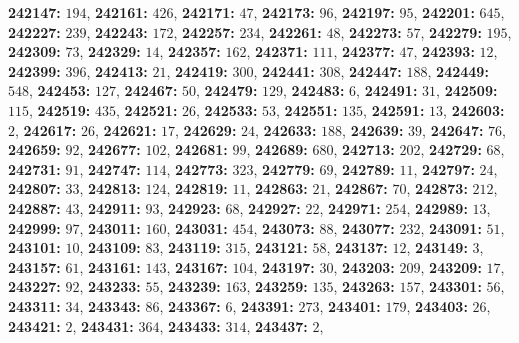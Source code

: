 \textsf{\bfseries 242147:} $194$, \textsf{\bfseries 242161:} $426$, \textsf{\bfseries 242171:} $47$, \textsf{\bfseries 242173:} $96$, \textsf{\bfseries 242197:} $95$, \textsf{\bfseries 242201:} $645$, \textsf{\bfseries 242227:} $239$, \textsf{\bfseries 242243:} $172$, \textsf{\bfseries 242257:} $234$, \textsf{\bfseries 242261:} $48$, \textsf{\bfseries 242273:} $57$, \textsf{\bfseries 242279:} $195$, \textsf{\bfseries 242309:} $73$, \textsf{\bfseries 242329:} $14$, \textsf{\bfseries 242357:} $162$, \textsf{\bfseries 242371:} $111$, \textsf{\bfseries 242377:} $47$, \textsf{\bfseries 242393:} $12$, \textsf{\bfseries 242399:} $396$, \textsf{\bfseries 242413:} $21$, \textsf{\bfseries 242419:} $300$, \textsf{\bfseries 242441:} $308$, \textsf{\bfseries 242447:} $188$, \textsf{\bfseries 242449:} $548$, \textsf{\bfseries 242453:} $127$, \textsf{\bfseries 242467:} $50$, \textsf{\bfseries 242479:} $129$, \textsf{\bfseries 242483:} $6$, \textsf{\bfseries 242491:} $31$, \textsf{\bfseries 242509:} $115$, \textsf{\bfseries 242519:} $435$, \textsf{\bfseries 242521:} $26$, \textsf{\bfseries 242533:} $53$, \textsf{\bfseries 242551:} $135$, \textsf{\bfseries 242591:} $13$, \textsf{\bfseries 242603:} $2$, \textsf{\bfseries 242617:} $26$, \textsf{\bfseries 242621:} $17$, \textsf{\bfseries 242629:} $24$, \textsf{\bfseries 242633:} $188$, \textsf{\bfseries 242639:} $39$, \textsf{\bfseries 242647:} $76$, \textsf{\bfseries 242659:} $92$, \textsf{\bfseries 242677:} $102$, \textsf{\bfseries 242681:} $99$, \textsf{\bfseries 242689:} $680$, \textsf{\bfseries 242713:} $202$, \textsf{\bfseries 242729:} $68$, \textsf{\bfseries 242731:} $91$, \textsf{\bfseries 242747:} $114$, \textsf{\bfseries 242773:} $323$, \textsf{\bfseries 242779:} $69$, \textsf{\bfseries 242789:} $11$, \textsf{\bfseries 242797:} $24$, \textsf{\bfseries 242807:} $33$, \textsf{\bfseries 242813:} $124$, \textsf{\bfseries 242819:} $11$, \textsf{\bfseries 242863:} $21$, \textsf{\bfseries 242867:} $70$, \textsf{\bfseries 242873:} $212$, \textsf{\bfseries 242887:} $43$, \textsf{\bfseries 242911:} $93$, \textsf{\bfseries 242923:} $68$, \textsf{\bfseries 242927:} $22$, \textsf{\bfseries 242971:} $254$, \textsf{\bfseries 242989:} $13$, \textsf{\bfseries 242999:} $97$, \textsf{\bfseries 243011:} $160$, \textsf{\bfseries 243031:} $454$, \textsf{\bfseries 243073:} $88$, \textsf{\bfseries 243077:} $232$, \textsf{\bfseries 243091:} $51$, \textsf{\bfseries 243101:} $10$, \textsf{\bfseries 243109:} $83$, \textsf{\bfseries 243119:} $315$, \textsf{\bfseries 243121:} $58$, \textsf{\bfseries 243137:} $12$, \textsf{\bfseries 243149:} $3$, \textsf{\bfseries 243157:} $61$, \textsf{\bfseries 243161:} $143$, \textsf{\bfseries 243167:} $104$, \textsf{\bfseries 243197:} $30$, \textsf{\bfseries 243203:} $209$, \textsf{\bfseries 243209:} $17$, \textsf{\bfseries 243227:} $92$, \textsf{\bfseries 243233:} $55$, \textsf{\bfseries 243239:} $163$, \textsf{\bfseries 243259:} $135$, \textsf{\bfseries 243263:} $157$, \textsf{\bfseries 243301:} $56$, \textsf{\bfseries 243311:} $34$, \textsf{\bfseries 243343:} $86$, \textsf{\bfseries 243367:} $6$, \textsf{\bfseries 243391:} $273$, \textsf{\bfseries 243401:} $179$, \textsf{\bfseries 243403:} $26$, \textsf{\bfseries 243421:} $2$, \textsf{\bfseries 243431:} $364$, \textsf{\bfseries 243433:} $314$, \textsf{\bfseries 243437:} $2$, 
